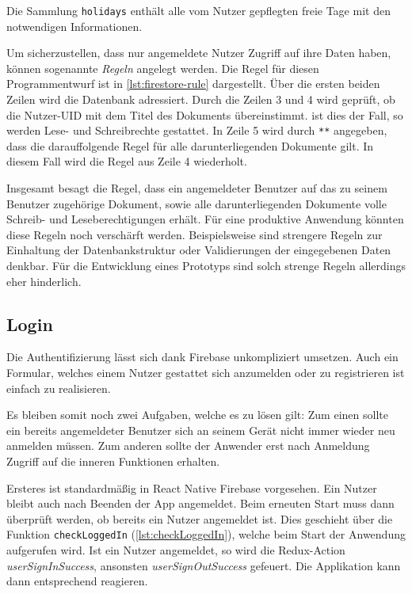 Die Sammlung \texttt{holidays} enthält alle vom Nutzer gepflegten freie Tage mit den notwendigen Informationen.

Um sicherzustellen, dass nur angemeldete Nutzer Zugriff auf ihre Daten haben,
können sogenannte \textit{Regeln} angelegt werden.
Die Regel für diesen Programmentwurf ist in \autoref{lst:firestore-rule} dargestellt.
Über die ersten beiden Zeilen wird die Datenbank adressiert.
Durch die Zeilen 3 und 4 wird geprüft, ob die Nutzer-UID mit dem Titel des Dokuments übereinstimmt.
ist dies der Fall, so werden Lese- und Schreibrechte gestattet.
In Zeile 5 wird durch \lstinline[language=firestoreRule]{**} angegeben,
dass die darauffolgende Regel für alle darunterliegenden Dokumente gilt.
In diesem Fall wird die Regel aus Zeile 4 wiederholt.




Insgesamt besagt die Regel,
dass ein angemeldeter Benutzer auf das zu seinem Benutzer zugehörige Dokument,
sowie alle darunterliegenden Dokumente volle Schreib- und Leseberechtigungen erhält.
Für eine produktive Anwendung könnten diese Regeln noch verschärft werden.
Beispielsweise sind strengere Regeln zur Einhaltung der Datenbankstruktur oder Validierungen der eingegebenen Daten denkbar.
Für die Entwicklung eines Prototyps sind solch strenge Regeln allerdings eher hinderlich.


\subsection{Login}
Die Authentifizierung lässt sich dank Firebase unkompliziert umsetzen.
Auch ein Formular, welches einem Nutzer gestattet sich anzumelden oder zu registrieren ist einfach zu realisieren.

Es bleiben somit noch zwei Aufgaben, welche es zu lösen gilt:
Zum einen sollte ein bereits angemeldeter Benutzer sich an seinem Gerät nicht immer wieder neu anmelden müssen.
Zum anderen sollte der Anwender erst nach Anmeldung Zugriff auf die inneren Funktionen erhalten.

Ersteres ist standardmäßig in React Native Firebase vorgesehen.
Ein Nutzer bleibt auch nach Beenden der App angemeldet.
Beim erneuten Start muss dann überprüft werden, ob bereits ein Nutzer angemeldet ist.
Dies geschieht über die Funktion \texttt{checkLoggedIn} (\autoref{lst:checkLoggedIn}),
welche beim Start der Anwendung aufgerufen wird.
Ist ein Nutzer angemeldet, so wird die Redux-Action \emph{userSignInSuccess},
ansonsten \emph{userSignOutSuccess} gefeuert.
Die Applikation kann dann entsprechend reagieren.

